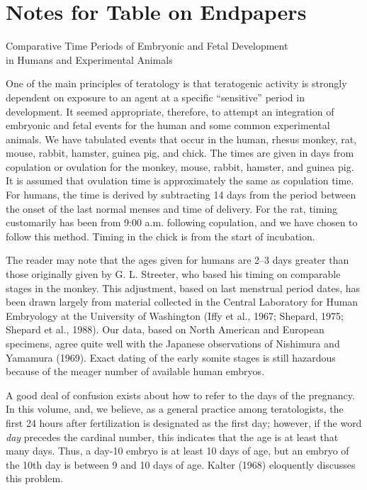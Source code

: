 \clearemptydoublepage
\chapter{Notes for Table on Endpapers}

\vspace*{-1pc}
{\sffamily \Large
Comparative Time Periods of Embryonic and Fetal Development\\
in Humans and Experimental Animals
}

\vspace{24pt}



\noindent
One of the main principles of teratology is that teratogenic activity
is strongly dependent on exposure to an agent at a specific
``sensitive'' period in development. It seemed appropriate,
therefore, to attempt an integration of embryonic and fetal events
for the human and some common experimental animals. We have tabulated
events that occur in the human, rhesus monkey, rat, mouse, rabbit,
hamster, guinea pig, and chick. The times are given in days from
copulation or ovulation for the monkey, mouse, rabbit, hamster, and
guinea pig. It is assumed that ovulation time is
approximately the same as copulation time. For humans, the time is
derived by subtracting 14 days from the period between the onset of
the last normal menses and time of delivery. For the rat, timing
customarily has been from 9:00 a.m. following copulation, and we have
chosen to follow this method. Timing in the chick is from the start
of incubation.

The reader may note that the ages given for humans are 2--3 days
greater than those originally given by G. L. Streeter, who based
his timing on comparable stages in the monkey. This adjustment, based
on last menstrual period dates, has been drawn largely from material
collected in the Central Laboratory for Human Embryology at the
University of Washington (Iffy et al., 1967; Shepard, 1975; 
Shepard et al., 1988).  Our data, based on North American and
European specimens, agree quite well with the Japanese observations
of Nishimura and Yamamura (1969).  Exact dating of the early somite
stages is still hazardous because of the meager number of available
human embryos.

A good deal of confusion exists about how to refer to 
the days of the pregnancy.
In this volume, and, we believe, as a general
practice among teratologists, the first 24 hours after fertilization
is designated as the first day; however, if the word {\it day}
precedes the cardinal number, this indicates that the age is at least
that many days.  Thus, a day-10 embryo is at least 10 days of age,
but an embryo of the 10th day is between 9 and 10 days of age.
Kalter (1968) eloquently discusses this problem.

